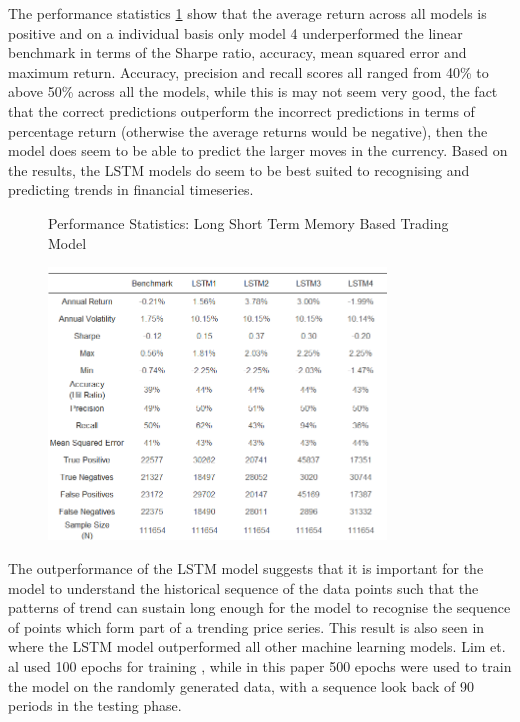 \documentclass[11pt]{article}
\begin{document}
The performance statistics \ref{fig:LSTMRandomDataStats} show that the average return across all models  is positive and on a individual basis only model 4 underperformed the linear benchmark in terms of the Sharpe ratio, accuracy, mean squared error and maximum return.  Accuracy, precision and recall scores all ranged from 40\% to above 50\% across all the models, while this is may not seem very good, the fact that the correct predictions outperform the incorrect predictions in terms of percentage return (otherwise the average returns would be negative), then the model does seem to be able to predict the larger moves in the currency. Based on the results, the LSTM models do seem to be best suited to recognising and predicting trends in financial timeseries.
\begin{figure}[h]
    \centering
	\caption{Performance Statistics: Long Short Term Memory Based Trading Model}    
	\includegraphics[width=0.8\textwidth]{LSTMRandomDataStatsv3}
    \label{fig:LSTMRandomDataStats}
     \caption*{}
\end{figure}
\vspace{3mm}
The outperformance of the LSTM model suggests that it is important for the model to understand the historical sequence of the data points such that the patterns of trend can sustain long enough for the model to recognise the sequence of points which form part of a trending price series. This result is also seen in \cite{Lim2019} where the LSTM model outperformed all other machine learning models. Lim et. al used 100 epochs for training \cite{Lim2019}, while in this paper 500 epochs were used to train the model on the randomly generated data, with a sequence look back of 90 periods in the testing phase.
\end{document}

